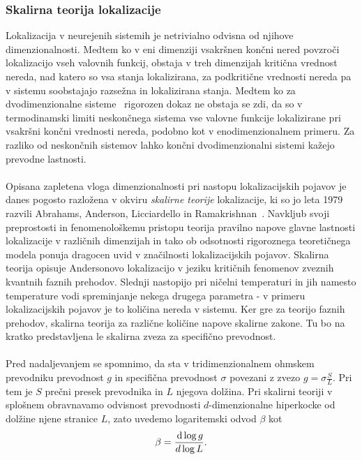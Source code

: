 \documentclass[10pt,a4paper]{article}
\begin{document}
\subsubsection{Skalirna teorija lokalizacije}
Lokalizacija v neurejenih sistemih je netrivialno odvisna od njihove dimenzionalnosti. Medtem ko v eni dimenziji vsakršnen končni nered povzroči lokalizacijo vseh valovnih funkcij, obstaja v treh dimenzijah kritična vrednost nereda, nad katero so vsa stanja lokalizirana, za podkritične vrednosti nereda pa v sistemu soobstajajo razsežna in lokalizirana stanja. Medtem ko za dvodimenzionalne sisteme~\cite{kramer1993localization} rigorozen dokaz ne obstaja se zdi, da so v termodinamski limiti neskončnega sistema vse valovne funkcije lokalizirane pri vsakršni končni vrednosti nereda, podobno kot v enodimenzionalnem primeru. Za razliko od neskončnih sistemov lahko končni dvodimenzionalni sistemi kažejo prevodne lastnosti. \\\\ 
Opisana zapletena vloga dimenzionalnosti pri nastopu lokalizacijskih pojavov je danes pogosto razložena v okviru \emph{skalirne teorije} lokalizacije, ki so jo leta 1979 razvili Abrahams, Anderson, Licciardello in Ramakrishnan~\cite{abrahams1979scaling}. Navkljub svoji preprostosti in fenomenološkemu pristopu teorija pravilno napove glavne lastnosti lokalizacije v različnih dimenzijah in tako ob odsotnosti rigoroznega teoretičnega modela ponuja dragocen uvid v značilnosti lokalizacijskih pojavov. Skalirna teorija opisuje Andersonovo lokalizacijo v jeziku kritičnih fenomenov zveznih kvantnih faznih prehodov. Slednji nastopijo pri ničelni temperaturi in jih namesto temperature vodi spreminjanje nekega drugega parametra - v primeru lokalizacijskih pojavov je to količina nereda v sistemu. Ker gre za teorijo faznih prehodov, skalirna teorija za različne količine napove skalirne zakone. Tu bo na kratko predstavljena le skalirna zveza za specifično prevodnost.\\\\
Pred nadaljevanjem se spomnimo, da sta v tridimenzionalnem ohmskem prevodniku prevodnost $g$ in specifična prevodnost $\sigma$ povezani z zvezo $g=\sigma\frac{S}{L}.$ Pri tem je $S$ prečni presek prevodnika in $L$ njegova dolžina. Pri skalirni teoriji v splošnem obravnavamo odvisnost prevodnosti $d$-dimenzionalne hiperkocke od dolžine njene stranice $L$, zato uvedemo logaritemski odvod $\beta$ kot 
\begin{equation}\label{eq:beta_log}
\beta=\frac{\,\mathrm{d} \log g}{\\d \log L}.
\end{equation}
\end{document}
